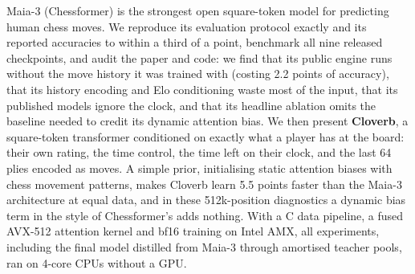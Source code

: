 Maia-3 (Chessformer) is the strongest open square-token model for predicting human chess moves. We
reproduce its evaluation protocol exactly and its reported accuracies to within a third of a point,
benchmark all nine released checkpoints, and audit the paper and code: we find that its public engine
runs without the move history it was trained with (costing 2.2 points of accuracy), that its history
encoding and Elo conditioning waste most of the input, that its published models ignore the clock,
and that its headline ablation omits the baseline needed to credit its dynamic attention bias.
We then present \textbf{Cloverb}, a square-token transformer conditioned on exactly what a player
has at the board: their own rating, the time control, the time left on their clock, and the last
64 plies encoded as moves. A simple prior, initialising static attention biases with chess movement
patterns, makes Cloverb learn 5.5 points faster than the Maia-3 architecture at equal data, and in
these 512k-position diagnostics a dynamic bias term in the style of Chessformer's adds nothing.
With a C data pipeline, a fused AVX-512 attention kernel and bf16 training on Intel AMX, all
experiments, including the final model distilled from Maia-3 through amortised teacher pools, ran
on 4-core CPUs without a GPU.

